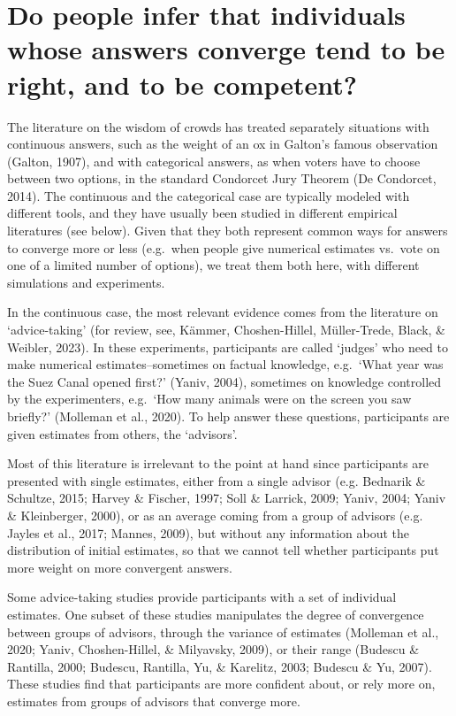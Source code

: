 \documentclass[
  doc,floatsintext]{apa6}
\begin{document}
\section{Do people infer that individuals whose answers converge tend to be right, and to be competent?}\label{do-people-infer-that-individuals-whose-answers-converge-tend-to-be-right-and-to-be-competent}

The literature on the wisdom of crowds has treated separately situations with continuous answers, such as the weight of an ox in Galton's famous observation (Galton, 1907), and with categorical answers, as when voters have to choose between two options, in the standard Condorcet Jury Theorem (De Condorcet, 2014). The continuous and the categorical case are typically modeled with different tools, and they have usually been studied in different empirical literatures (see below). Given that they both represent common ways for answers to converge more or less (e.g.~when people give numerical estimates vs.~vote on one of a limited number of options), we treat them both here, with different simulations and experiments.

In the continuous case, the most relevant evidence comes from the literature on `advice-taking' (for review, see, Kämmer, Choshen-Hillel, Müller-Trede, Black, \& Weibler, 2023). In these experiments, participants are called `judges' who need to make numerical estimates--sometimes on factual knowledge, e.g.~`What year was the Suez Canal opened first?' (Yaniv, 2004), sometimes on knowledge controlled by the experimenters, e.g.~`How many animals were on the screen you saw briefly?' (Molleman et al., 2020). To help answer these questions, participants are given estimates from others, the `advisors'.

Most of this literature is irrelevant to the point at hand since participants are presented with single estimates, either from a single advisor (e.g. Bednarik \& Schultze, 2015; Harvey \& Fischer, 1997; Soll \& Larrick, 2009; Yaniv, 2004; Yaniv \& Kleinberger, 2000), or as an average coming from a group of advisors (e.g. Jayles et al., 2017; Mannes, 2009), but without any information about the distribution of initial estimates, so that we cannot tell whether participants put more weight on more convergent answers.

Some advice-taking studies provide participants with a set of individual estimates. One subset of these studies manipulates the degree of convergence between groups of advisors, through the variance of estimates (Molleman et al., 2020; Yaniv, Choshen-Hillel, \& Milyavsky, 2009), or their range (Budescu \& Rantilla, 2000; Budescu, Rantilla, Yu, \& Karelitz, 2003; Budescu \& Yu, 2007). These studies find that participants are more confident about, or rely more on, estimates from groups of advisors that converge more.
\end{document}
